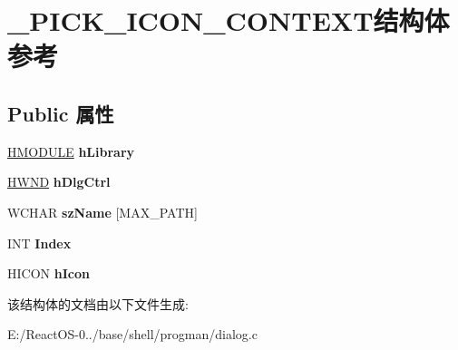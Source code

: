 \hypertarget{struct___p_i_c_k___i_c_o_n___c_o_n_t_e_x_t}{}\section{\+\_\+\+P\+I\+C\+K\+\_\+\+I\+C\+O\+N\+\_\+\+C\+O\+N\+T\+E\+X\+T结构体 参考}
\label{struct___p_i_c_k___i_c_o_n___c_o_n_t_e_x_t}
\subsection*{Public 属性}
\begin{DoxyCompactItemize}
\item 
\mbox{\label{struct___p_i_c_k___i_c_o_n___c_o_n_t_e_x_t_a51478e2ad2bd6515eb2245117ada0910}} 
\hyperlink{interfacevoid}{H\+M\+O\+D\+U\+LE} {\bfseries h\+Library}
\item 
\mbox{\label{struct___p_i_c_k___i_c_o_n___c_o_n_t_e_x_t_a2870fee12f21ce64c493387ff467989b}} 
\hyperlink{interfacevoid}{H\+W\+ND} {\bfseries h\+Dlg\+Ctrl}
\item 
\mbox{\label{struct___p_i_c_k___i_c_o_n___c_o_n_t_e_x_t_a808823e2b6df00d16ccb45a816abb28b}} 
W\+C\+H\+AR {\bfseries sz\+Name} \mbox{[}M\+A\+X\+\_\+\+P\+A\+TH\mbox{]}
\item 
\mbox{\label{struct___p_i_c_k___i_c_o_n___c_o_n_t_e_x_t_abed9ca5973df55a5ad01cab3de883abd}} 
I\+NT {\bfseries Index}
\item 
\mbox{\label{struct___p_i_c_k___i_c_o_n___c_o_n_t_e_x_t_a5abc8ca1931865b96229355cb34f35dc}} 
H\+I\+C\+ON {\bfseries h\+Icon}
\end{DoxyCompactItemize}


该结构体的文档由以下文件生成\+:\begin{DoxyCompactItemize}
\item 
E\+:/\+React\+O\+S-\/0../base/shell/progman/dialog.\+c\end{DoxyCompactItemize}
